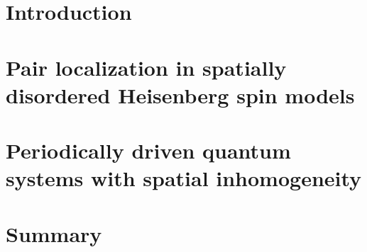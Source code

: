 \documentclass[ %
				numbers=noenddot,%
                headinclude,footinclude,cleardoublepage=empty,abstract=on,
                paper=a4,fontsize=11pt]{scrreprt}
\begin{document}
\frenchspacing
\raggedbottom
{} %
\pagestyle{plain}



\cleardoublepage
\cleardoublepage
\cleardoublepage
\cleardoublepage

\cleardoublepage
\pagestyle{scrheadings}
\cleardoublepage

\part{Introduction}


\part{Pair localization in spatially disordered Heisenberg spin models}\label{pt:spatial-disorder}









\part{Periodically driven quantum systems with spatial inhomogeneity}\label{pt:floquet}








\part{Summary}

\end{document}
